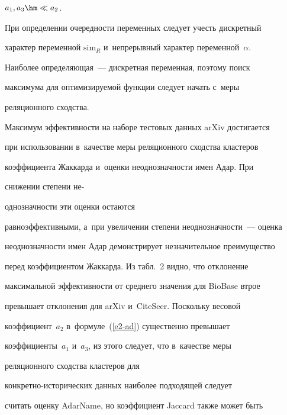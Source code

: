 $a_1, a_3\hm\ll a_2$.


  


  При определении очередности переменных следует учесть дискретный 


характер переменной $\mathrm{sim}_R$ и~непрерывный характер переменной~$\alpha$. 


Наиболее опре\-де\-ля\-ющая~--- дискретная переменная, поэтому поиск 


максимума для оп\-ти\-ми\-зи\-ру\-емой функции следует начать с~меры 


реляционного сходства.


  


  Максимум эффективности на наборе тестовых данных arXiv достигается 


при использовании в~качестве меры реляционного сходства клас\-те\-ров 


коэффициента Жаккарда и~оценки неоднозначности имен Адар. При 


снижении степени не-\linebreak\vspace*{-12pt}





\pagebreak





\noindent


од\-но\-знач\-ности эти оценки остаются 


равноэффективными, а~при увеличении степени не\-од\-но\-знач\-ности~--- оценка 


неоднозначности имен Адар демонстрирует незначительное преимущество 


перед коэффициентом Жаккарда. Из табл.~2 видно, что отклонение 


максимальной эф\-фек\-тив\-ности от сред\-не\-го значения для BioBase втрое 


превышает отклонения для arXiv и~CiteSeer. Поскольку весовой 


коэффициент~$a_2$ в~формуле~(\ref{e2-ad}) существенно превышает 


коэффициенты~$a_1$ и~$a_3$, из этого следует, что в~качестве меры 


реляционного сходства клас\-те\-ров для  


кон\-крет\-но-ис\-то\-ри\-че\-ских данных наиболее подходящей следует 


считать оценку AdarName, но коэффициент Jaccard так\-же может быть 


